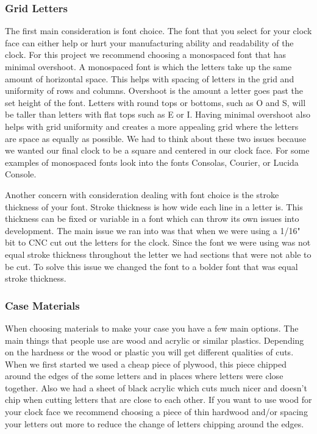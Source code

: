 \documentclass[onecolumn, draftclsnofoot,10pt, compsoc]{IEEEtran}
\begin{document}
\subsubsection{Grid Letters}
The first main consideration is font choice.
The font that you select for your clock face can either help or hurt your manufacturing ability and readability of the clock.
For this project we recommend choosing a monospaced font that has minimal overshoot.
A monospaced font is which the letters take up the same amount of horizontal space.
This helps with spacing of letters in the grid and uniformity of rows and columns.
Overshoot is the amount a letter goes past the set height of the font.
Letters with round tops or bottoms, such as O and S, will be taller than letters with flat tops such as E or I.
Having minimal overshoot also helps with grid uniformity and creates a more appealing grid where the letters are space as equally as possible.
We had to think about these two issues because we wanted our final clock to be a square and centered in our clock face.
For some examples of monospaced fonts look into the fonts Consolas, Courier, or Lucida Console.

Another concern with consideration dealing with font choice is the stroke thickness of your font.
Stroke thickness is how wide each line in a letter is.
This thickness can be fixed or variable in a font which can throw its own issues into development.
The main issue we ran into was that when we were using a 1/16" bit to CNC cut out the letters for the clock.
Since the font we were using was not equal stroke thickness throughout the letter we had sections that were not able to be cut.
To solve this issue we changed the font to a bolder font that was equal stroke thickness.

\subsubsection{Case Materials}
When choosing materials to make your case you have a few main options.
The main things that people use are wood and acrylic or similar plastics.
Depending on the hardness or the wood or plastic you will get different qualities of cuts.
When we first started we used a cheap piece of plywood, this piece chipped around the edges of the some letters and in places where letters were close together.
Also we had a sheet of black acrylic which cuts much nicer and doesn't chip when cutting letters that are close to each other.
If you want to use wood for your clock face we recommend choosing a piece of thin hardwood and/or spacing your letters out more to reduce the change of letters chipping around the edges.
\end{document}
